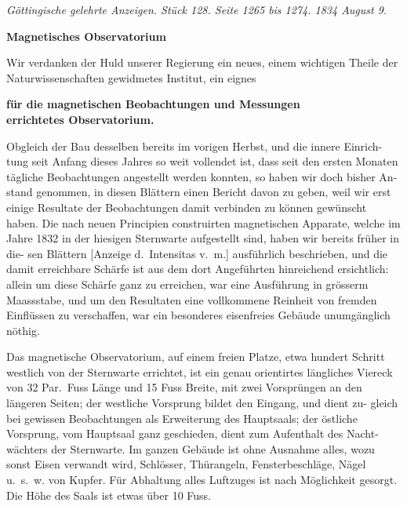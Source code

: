 \documentclass[12pt,a4paper]{article}
\begin{document}
\textit{Göttingische gelehrte Anzeigen. Stück 128. Seite 1265 bis 1274. 1834 August 9.}

\begin{center}
\textbf{Magnetisches Observatorium}
\end{center}

Wir verdanken der Huld unserer Regierung ein neues, einem wichtigen 
Theile der Naturwissenschaften gewidmetes Institut, ein eignes 
\begin{center}
\textbf{für die magnetischen Beobachtungen und Messungen}\\
\textbf{errichtetes Observatorium.}
\end{center}

Obgleich der Bau desselben bereits im vorigen Herbst, und die innere Einrich-
tung seit Anfang dieses Jahres so weit vollendet ist, dass seit den ersten Monaten 
tägliche Beobachtungen angestellt werden konnten, so haben wir doch bisher An-
stand genommen, in diesen Blättern einen Bericht davon zu geben, weil wir erst 
einige Resultate der Beobachtungen damit verbinden zu können gewünscht haben. 
Die nach neuen Principien construirten magnetischen Apparate, welche im Jahre 
1832 in der hiesigen Sternwarte aufgestellt sind, haben wir bereits früher in die-
sen Blättern [Anzeige d.\ Intensitas v.\ m.] ausführlich beschrieben, und die damit 
erreichbare Schärfe ist aus dem dort Angeführten hinreichend ersichtlich: allein 
um diese Schärfe ganz zu erreichen, war eine Ausführung in grösserm Maassstabe, 
und um den Resultaten eine vollkommene Reinheit von fremden Einflüssen zu 
verschaffen, war ein besonderes eisenfreies Gebäude unumgänglich nöthig.

Das magnetische Observatorium, auf einem freien Platze, etwa hundert 
Schritt westlich von der Sternwarte errichtet, ist ein genau orientirtes längliches 
Viereck von 32 Par.\ Fuss Länge und 15 Fuss Breite, mit zwei Vorsprüngen an 
den längeren Seiten; der westliche Vorsprung bildet den Eingang, und dient zu-
gleich bei gewissen Beobachtungen als Erweiterung des Hauptsaals; der östliche 
Vorsprung, vom Hauptsaal ganz geschieden, dient zum Aufenthalt des Nacht-
wächters der Sternwarte. Im ganzen Gebäude ist ohne Ausnahme alles, wozu 
sonst Eisen verwandt wird, Schlösser, Thürangeln, Fensterbeschläge, Nägel u.\ s.\ w. 
von Kupfer. Für Abhaltung alles Luftzuges ist nach Möglichkeit gesorgt. Die 
Höhe des Saals ist etwas über 10 Fuss.
\end{document}
